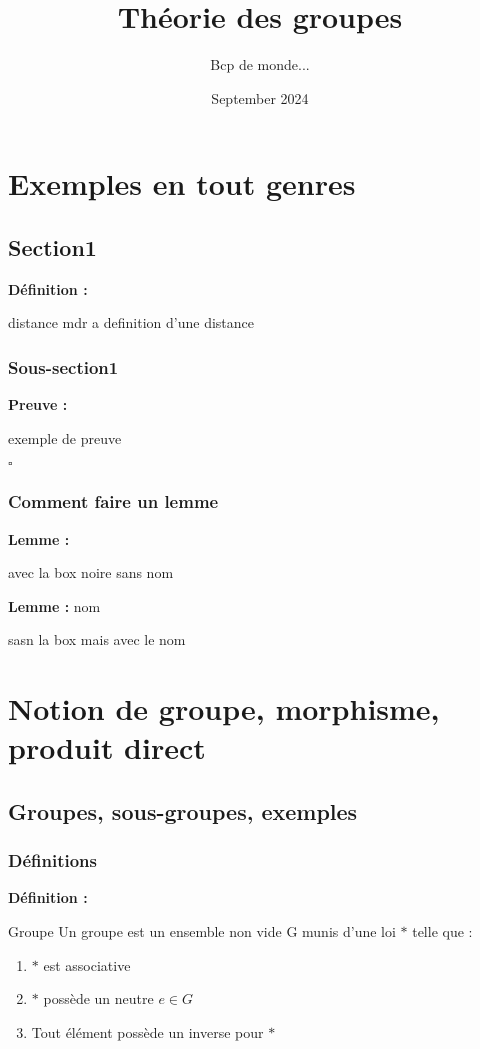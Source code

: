 \documentclass{report}
\title{Théorie des groupes}
\author{Bcp de monde... }
\date{September 2024}
\renewenvironment{leftbar}{%
  \def\FrameCommand{\vrule width 0.4pt \hspace{10pt}}%
  \MakeFramed {\advance\hsize-\width \FrameRestore}}%
 {\endMakeFramed}%
\newenvironment{definition}[1][]{
    \begin{tcolorbox}[colframe= white]
    \textbf{Définition :} 
    #1 \par
    }
    {\end{tcolorbox}}
\newenvironment{preuve}{\vspace*{0.5cm}
    \begin{leftbar}
    \noindent\textbf{Preuve :}\par}{
    \begin{flushright}
    $\square$
    \end{flushright}
    \end{leftbar}
}
\newenvironment{lemme}[2][white]{\begin{tcolorbox}[colframe= #1]
    \textbf{Lemme :} #2  \par}
    {\end{tcolorbox}}
\begin{document}
\maketitle

\tableofcontents

\chapter*{Exemples en tout genres}



\section{Section1}
\begin{definition}{distance}
    mdr a definition d'une distance
\end{definition}
\subsection{Sous-section1}


\begin{preuve}
    exemple de preuve
\end{preuve}

\subsection{Comment faire un lemme}
\begin{lemme}[black]{}
avec la box noire sans nom
\end{lemme}

\begin{lemme}{nom}
    sasn la box mais avec le nom
\end{lemme}



\chapter{Notion de groupe, morphisme, produit direct}


\section{Groupes, sous-groupes, exemples}

\subsection{Définitions}
\begin{definition}{Groupe}
Un groupe est un ensemble non vide G munis d'une loi $\ast$ telle que :
\begin{enumerate}[label=(\roman*)]
\item $\ast$ est associative
\item $\ast$ possède un neutre $e\in G$
\item Tout élément possède un inverse pour $\ast$
\end{enumerate}

\end{definition}
\end{document}
